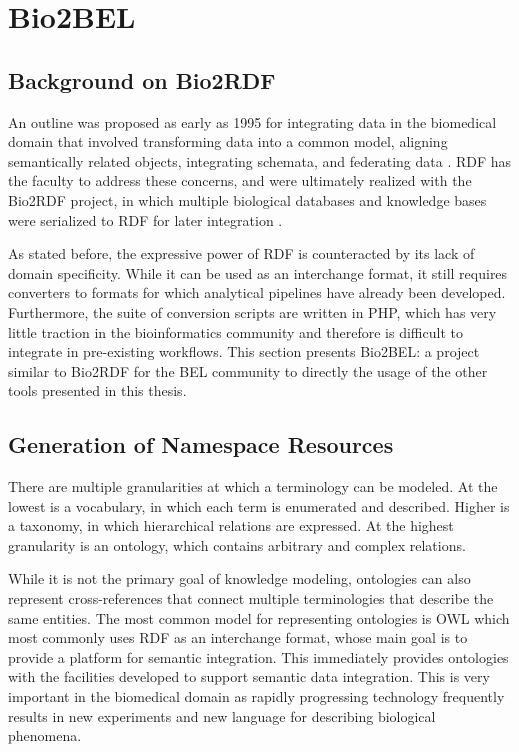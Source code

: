 \chapter{Bio2BEL}
\label{ch:bio2bel}

\section{Background on Bio2RDF}

An outline was proposed as early as 1995 for integrating data in the biomedical domain that involved transforming data into a common model, aligning semantically related objects, integrating schemata, and federating data \cite{Davidson1995}. \ac{RDF} has the faculty to address these concerns, and were ultimately realized with the Bio2RDF project, in which multiple biological databases and knowledge bases were serialized to RDF for later integration \cite{Belleau2008}.

As stated before, the expressive power of RDF is counteracted by its lack of domain specificity. While it can be used as an interchange format, it still requires converters to formats for which analytical pipelines have already been developed. Furthermore, the suite of conversion scripts are written in PHP, which has very little traction in the bioinformatics community and therefore is difficult to integrate in pre-existing workflows. This section presents Bio2BEL: a project similar to Bio2RDF for the BEL community to directly the usage of the other tools presented in this thesis.

\section{Generation of Namespace Resources}

There are multiple granularities at which a terminology can be modeled. At the lowest is a vocabulary, in which each term is enumerated and described. Higher is a taxonomy, in which hierarchical relations are expressed. At the highest granularity is an ontology, which contains arbitrary and complex relations.

While it is not the primary goal of knowledge modeling, ontologies can also represent cross-references that connect multiple terminologies that describe the same entities. The most common model for representing ontologies is \ac{OWL} which most commonly uses \ac{RDF} as an interchange format, whose main goal is to provide a platform for semantic integration. This immediately provides ontologies with the facilities developed to support semantic data integration. This is very important in the biomedical domain as rapidly progressing technology frequently results in new experiments and new language for describing biological phenomena.

